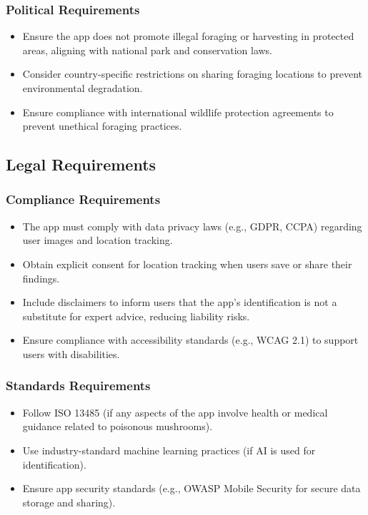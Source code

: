 \documentclass[]{article}
\begin{document}
\subsubsection{Political Requirements}
\begin{itemize}
    \item Ensure the app does not promote illegal foraging or harvesting in protected areas, aligning with national park and conservation laws.
    \item Consider country-specific restrictions on sharing foraging locations to prevent environmental degradation.
    \item Ensure compliance with international wildlife protection agreements to prevent unethical foraging practices.
\end{itemize}

\subsection{Legal Requirements}
\subsubsection{Compliance Requirements}
\begin{itemize}
    \item The app must comply with data privacy laws (e.g., GDPR, CCPA) regarding user images and location tracking.
    \item Obtain explicit consent for location tracking when users save or share their findings.
    \item Include disclaimers to inform users that the app’s identification is not a substitute for expert advice, reducing liability risks.
    \item Ensure compliance with accessibility standards (e.g., WCAG 2.1) to support users with disabilities.
\end{itemize}

\subsubsection{Standards Requirements}
\begin{itemize}
    \item Follow ISO 13485 (if any aspects of the app involve health or medical guidance related to poisonous mushrooms).
    \item Use industry-standard machine learning practices (if AI is used for identification).
    \item Ensure app security standards (e.g., OWASP Mobile Security for secure data storage and sharing).
\end{itemize}
\end{document}
